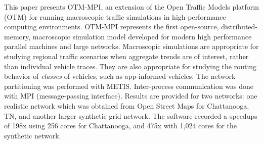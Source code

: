 This paper presents OTM-MPI, an extension of the Open Traffic Models platform (OTM) for running macroscopic traffic simulations in high-performance computing environments. OTM-MPI represents
the first open-source, distributed-memory, macroscopic
simulation model developed for modern high performance
parallel machines and large networks. Macroscopic simulations are appropriate for studying regional traffic scenarios when aggregate trends are of interest, rather than individual vehicle traces. They are also appropriate for studying the routing behavior of \textit{classes} of vehicles, such as app-informed vehicles. The network partitioning was performed with METIS. Inter-process communication was done with MPI (message-passing interface). Results are provided for two networks: one realistic network which was obtained from Open Street Maps for Chattanooga, TN, and another larger synthetic grid network. The software recorded a speedups of 198x using 256 cores for Chattanooga, and 475x with 1,024 cores for the synthetic network. 
